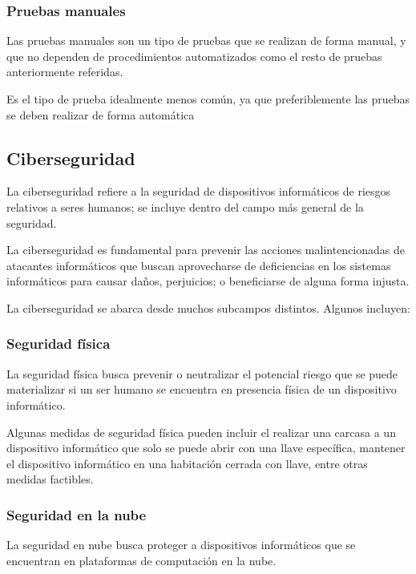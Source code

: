 \documentclass[12pt,a4paper,twoside,openright]{book}
\begin{document}
\subsubsection{Pruebas manuales}

Las pruebas manuales son un tipo de pruebas que se realizan de forma manual, y que no dependen de procedimientos automatizados como el resto de pruebas anteriormente referidas.

Es el tipo de prueba idealmente menos común, ya que preferiblemente las pruebas se deben realizar de forma automática

\subsection{Ciberseguridad}

La ciberseguridad refiere a la seguridad de dispositivos informáticos de riesgos relativos a seres humanos; se incluye dentro del campo más general de la seguridad.

La ciberseguridad es fundamental para prevenir las acciones malintencionadas de atacantes informáticos que buscan aprovecharse de deficiencias en los sistemas informáticos para causar daños, perjuicios; o beneficiarse de alguna forma injusta.

La ciberseguridad se abarca desde muchos subcampos distintos. Algunos incluyen:

\subsubsection{Seguridad física}

La seguridad física busca prevenir o neutralizar el potencial riesgo que se puede materializar si un ser humano se encuentra en presencia física de un dispositivo informático.

Algunas medidas de seguridad física pueden incluir el realizar una carcasa a un dispositivo informático que solo se puede abrir con una llave específica, mantener el dispositivo informático en una habitación cerrada con llave, entre otras medidas factibles.

\subsubsection{Seguridad en la nube}

La seguridad en nube busca proteger a dispositivos informáticos que se encuentran en plataformas de computación en la nube.
\end{document}
